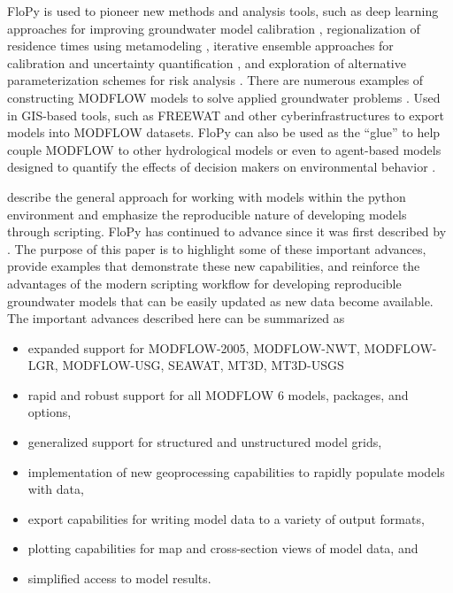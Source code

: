 \documentclass[11pt, oneside]{article}   	%
\begin{document}
 FloPy is used to pioneer new methods and analysis tools, such as deep learning approaches for improving groundwater model calibration \citep{sun2018, zhou2021}, regionalization of residence times using metamodeling \citep{starn2018}, iterative ensemble approaches for calibration and uncertainty quantification \citep{white2018ies}, and exploration of alternative parameterization schemes for risk analysis \citep{knowling2019}. There are numerous examples of constructing MODFLOW models to solve applied groundwater problems \citep{befus2017, vanengelen2018, ebeling2019, zipper2019, befus2020}.  Used in GIS-based tools, such as FREEWAT \citep{freewat2018} and other cyberinfrastructures \citep{essawy2018} to export models into MODFLOW datasets.  FloPy can also be used as the ``glue'' to help couple MODFLOW to other hydrological models \citep{burek2020} or even to agent-based models designed to quantify the effects of decision makers on environmental behavior \citep{jaxarozen2019}. 

\cite{bakker2016scripting} describe the general approach for working with models within the python environment and emphasize the reproducible nature of developing models through scripting.  FloPy has continued to advance since it was first described by \cite{bakker2016scripting}.  The purpose of this paper is to highlight some of these important advances, provide examples that demonstrate these new capabilities, and reinforce the advantages of the modern scripting workflow for developing reproducible groundwater models that can be easily updated as new data become available.  The important advances described here can be summarized as

\begin{itemize}
\item expanded support for MODFLOW-2005, MODFLOW-NWT, MODFLOW-LGR, MODFLOW-USG, SEAWAT, MT3D, MT3D-USGS
\item rapid and robust support for all MODFLOW 6 models, packages, and options,
\item generalized support for structured and unstructured model grids,
\item implementation of new geoprocessing capabilities to rapidly populate models with data, 
\item export capabilities for writing model data to a variety of output formats, 
\item plotting capabilities for map and cross-section views of model data, and
\item simplified access to model results.
\end{itemize}
\end{document}
